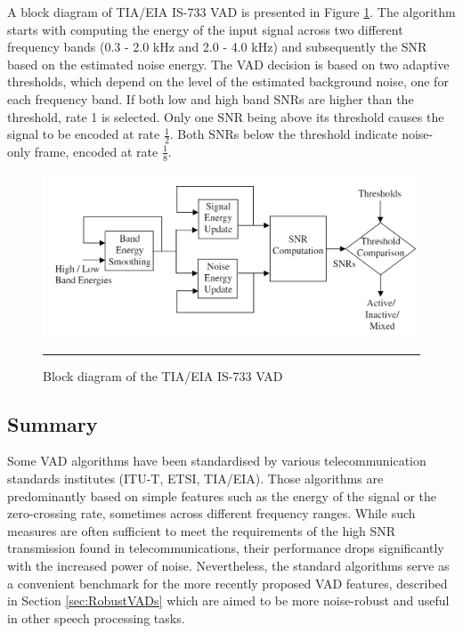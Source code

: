 A block diagram of TIA/EIA IS-733 VAD is presented in Figure \ref{fig:IS733}. The algorithm starts with computing the energy of the input signal across two different frequency bands (0.3 - 2.0 kHz and 2.0 - 4.0 kHz) and subsequently the SNR based on the estimated noise energy. The VAD decision is based on two adaptive thresholds, which depend on the level of the estimated background noise, one for each frequency band. If both low and high band SNRs are higher than the threshold, rate 1 is selected. Only one SNR being above its threshold causes the signal to be encoded at rate $\frac{1}{2}$. Both SNRs below the threshold indicate noise-only frame, encoded at rate $\frac{1}{8}$.

\begin{figure}[htbp]
	\centering
		\includegraphics[width=0.9\columnwidth]{Figures/Chapter2/IS733.png}
		\rule{37em}{0.5pt}
	\caption[Block diagram of the TIA/EIA IS-733 VAD]{Block diagram of the TIA/EIA IS-733 VAD \cite{Kondoz}}
	\label{fig:IS733}
\end{figure}

\subsection{Summary}

Some VAD algorithms have been standardised by various telecommunication standards institutes (ITU-T, ETSI, TIA/EIA). Those algorithms are predominantly based on simple features such as the energy of the signal or the zero-crossing rate, sometimes across different frequency ranges. While such measures are often sufficient to meet the requirements of the high SNR transmission found in telecommunications, their performance drops significantly with the increased power of noise. Nevertheless, the standard algorithms serve as a convenient benchmark for the more recently proposed VAD features, described in Section \ref{sec:RobustVADs} which are aimed to be more noise-robust and useful in other speech processing tasks.

